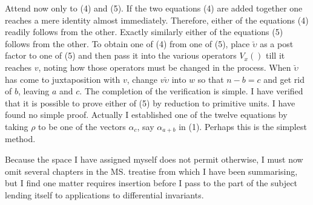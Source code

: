 \documentclass[11pt]{article}
\begin{document}
Attend now only to (4) and (5). If the two equations (4) are added together one reaches a mere identity almost immediately. Therefore, either of the equations (4) readily follows from the other. Exactly similarly either of the equations (5) follows from the other. To obtain one of (4) from one of (5), place $\breve\upsilon$ as a post factor to one of (5) and then pass it into the various operators $V_x()$ till it reaches $v$, noting how those operators must be changed in the process. When $\breve\upsilon$ has come to juxtaposition with $v$, change $v\breve\upsilon$ into $w$ so that $n-b=c$ and get rid of $b$, leaving $a$ and $c$. The completion of the verification is simple. I have verified that it is possible to prove either of (5) by reduction to primitive units. I have found no simple proof. Actually I established one of the twelve equations by taking $\rho$ to be one of the vectors $\alpha_c$, say $\alpha_{a+b}$ in (1). Perhaps this is the simplest method.


\indent Because the space I have assigned myself does not permit otherwise, I must now omit several chapters in the MS. treatise from which I have been summarising, but I find one matter requires insertion before I pass to the part of the subject lending itself to applications to differential invariants.
\end{document}
